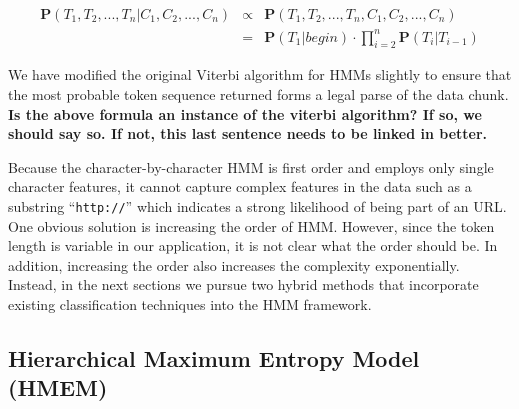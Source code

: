 \begin{eqnarray}
\mathbf{P}(T_1, T_2, ..., T_n|C_1, C_2, ..., C_n) & \propto & \mathbf{P}(T_1, T_2, ..., T_n, C_1, C_2, ..., C_n) \nonumber \\
& = & \mathbf{P}(T_1|begin) \cdot
\prod_{i=2}^{n}{\mathbf{P}(T_i|T_{i-1})}
\end{eqnarray}

We have modified the original Viterbi algorithm for HMMs slightly
to ensure that the most probable token sequence returned forms a legal
parse of the data chunk. {\bf Is the above formula an instance of
  the viterbi algorithm?  If so, we should say so. If not, this last
  sentence needs to be linked in better.}

Because the character-by-character HMM is first order and employs only 
single character features, it cannot capture complex features
in the data such as  
a substring ``{\tt http://}'' which indicates a strong likelihood 
of being part of an URL.
One obvious solution is increasing the order of HMM.  However, since
the token length is variable in our application, it is not clear what
the order should be.  In addition, increasing the order also increases
the complexity exponentially.  Instead, in the next sections we pursue
two hybrid methods that incorporate existing classification techniques
into the HMM framework.

\subsection{Hierarchical Maximum Entropy Model (HMEM)}\label{subsec:hmem}

